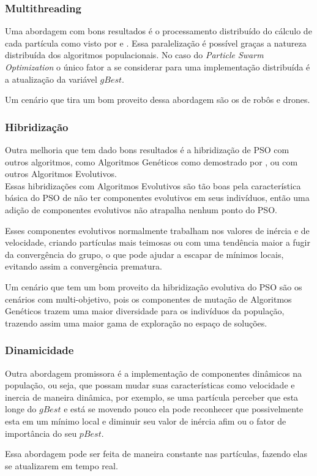         \subsubsection{Multithreading}
            Uma abordagem com bons resultados é o processamento distribuído do cálculo de cada partícula como visto por \cite{Thongkrairat2019} e \cite{Kim2011}. Essa paralelização é possível graças a natureza distribuída dos algoritmos populacionais. No caso do \textit{Particle Swarm Optimization} o único fator a se considerar para uma implementação distribuída é a atualização da variável $gBest$.\hfill\vspace{\onelineskip}
            
            Um cenário que tira um bom proveito dessa abordagem são os de robôs e drones.            

        \subsubsection{Hibridização}
            Outra melhoria que tem dado bons resultados é a hibridização de PSO com outros algoritmos, como Algoritmos Genéticos como demostrado por \cite{carvalho2014}, ou com outros Algoritmos Evolutivos.\hfill
            \\
            Essas hibridizações com Algoritmos Evolutivos são tão boas pela característica básica do PSO de não ter componentes evolutivos em seus indivíduos, então uma adição de componentes evolutivos não atrapalha nenhum ponto do PSO.\hfill\vspace{\onelineskip}
            
            Esses componentes evolutivos normalmente trabalham nos valores de inércia e de velocidade, criando partículas mais teimosas ou com uma tendência maior a fugir da convergência do grupo, o que pode ajudar a escapar de mínimos locais, evitando assim a convergência prematura.\hfill\vspace{\onelineskip}
            
            Um cenário que tem um bom proveito da hibridização evolutiva do PSO são os cenários com multi-objetivo, pois os componentes de mutação de Algoritmos Genéticos trazem uma maior diversidade para os indivíduos da população, trazendo assim uma maior gama de exploração no espaço de soluções.

        \subsubsection{Dinamicidade}
            Outra abordagem promissora é a implementação de componentes dinâmicos na população, ou seja, que possam mudar suas características como velocidade e inercia de maneira dinâmica, por exemplo, se uma partícula perceber que esta longe do $gBest$ e está se movendo pouco ela pode reconhecer que possivelmente esta em um mínimo local e diminuir seu valor de inércia afim ou o fator de importância do seu $pBest$.\hfill\vspace{\onelineskip}
            
            Essa abordagem pode ser feita de maneira constante nas partículas, fazendo elas se atualizarem em tempo real.


